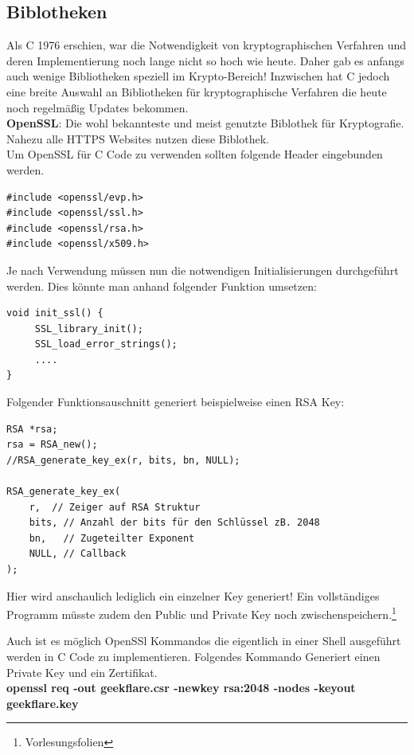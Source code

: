 \documentclass[a4paper,12pt]{scrartcl}
\begin{document}
\subsection{Biblotheken}
Als C 1976 erschien, war die Notwendigkeit von kryptographischen Verfahren und deren Implementierung noch lange nicht so hoch wie heute. Daher gab es anfangs auch wenige Bibliotheken speziell im Krypto-Bereich! Inzwischen hat C jedoch  eine breite Auswahl an Bibliotheken für kryptographische Verfahren die heute noch regelmäßig Updates bekommen.\\

\vspace{2mm}
\textbf{OpenSSL}: Die wohl bekannteste und meist genutzte Biblothek für Kryptografie. Nahezu alle HTTPS Websites nutzen diese Biblothek.\\

Um OpenSSL für C Code zu verwenden sollten folgende Header eingebunden werden.
\begin{verbatim}
#include <openssl/evp.h>
#include <openssl/ssl.h>
#include <openssl/rsa.h>
#include <openssl/x509.h>
\end{verbatim}
Je nach Verwendung müssen nun die notwendigen Initialisierungen durchgeführt werden. Dies könnte man anhand folgender Funktion umsetzen:
\begin{verbatim}
void init_ssl() {
     SSL_library_init(); 
     SSL_load_error_strings();
     ....
}
\end{verbatim}
Folgender Funktionsauschnitt generiert beispielweise einen RSA Key:
\begin{verbatim}
RSA *rsa;
rsa = RSA_new();
//RSA_generate_key_ex(r, bits, bn, NULL);

RSA_generate_key_ex(
	r,  // Zeiger auf RSA Struktur 
	bits, // Anzahl der bits für den Schlüssel zB. 2048
	bn,   // Zugeteilter Exponent  
	NULL, // Callback 
);

\end{verbatim}
Hier wird anschaulich lediglich ein einzelner Key generiert! Ein vollständiges Programm müsste zudem den Public und Private Key noch zwischenspeichern.\footnote{Vorlesungsfolien}

\newpage
Auch ist es möglich OpenSSl Kommandos die eigentlich in einer Shell ausgeführt werden in C Code zu implementieren.
Folgendes Kommando Generiert einen Private Key und ein Zertifikat.\\

\textbf{openssl req -out geekflare.csr -newkey rsa:2048 -nodes -keyout geekflare.key}
\end{document}
